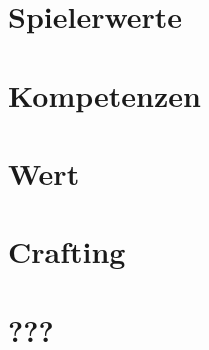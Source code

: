 \documentclass[a4paper,12pt,%
headsepline,%
numbers=noenddot,%
]{scrreprt}
\begin{document}
\part{Spielerwerte}



\part{Kompetenzen}



\part{Wert}



\part{Crafting}



\part{???}




\end{document}
